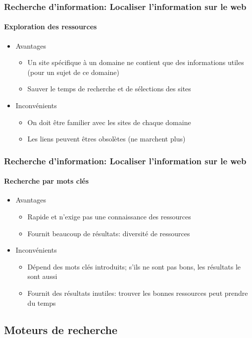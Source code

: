 \documentclass{beamer}
\begin{document}
\begin{frame}
\frametitle{Recherche d'information: Localiser l'information sur le web}
\framesubtitle{Exploration des ressources}

\begin{itemize}
	\item Avantages
	\begin{itemize}
		\item Un site spécifique à un domaine ne contient que des informations utiles (pour un sujet de ce domaine) 
		\item Sauver le temps de recherche et de sélections des sites 
	\end{itemize}
	\item Inconvénients
	\begin{itemize}
		\item On doit être familier avec les sites de chaque domaine 
		\item Les liens peuvent êtres obsolètes (ne marchent plus)
	\end{itemize}
\end{itemize} 

\end{frame}


\begin{frame}
\frametitle{Recherche d'information: Localiser l'information sur le web}
\framesubtitle{Recherche par mots clés}

\begin{itemize}
	\item Avantages
	\begin{itemize}
		\item Rapide et n'exige pas une connaissance des ressources
		\item Fournit beaucoup de résultats: diversité de ressources
	\end{itemize}
	\item Inconvénients
	\begin{itemize}
		\item Dépend des mots clés introduits; s'ils ne sont pas bons, les résultats le sont aussi
		\item Fournit des résultats inutiles: trouver les bonnes ressources peut prendre du temps
	\end{itemize}
\end{itemize} 

\end{frame}


\subsection{Moteurs de recherche}
\end{document}
